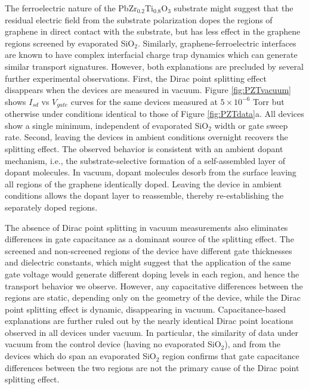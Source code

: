 \documentclass[edeposit,fullpage,draftthesis]{uiucthesis2009}
\begin{document}
The ferroelectric nature of the PbZr$_{0.2}$Ti$_{0.8}$O$_3$ substrate might suggest that the residual electric field from the substrate polarization dopes the regions of graphene in direct contact with the substrate\cite{Baeumer2013,Zheng2010}, but has less effect in the graphene regions screened by evaporated SiO$_2$. Similarly, graphene-ferroelectric interfaces are known to have complex interfacial charge trap dynamics which can generate similar transport signatures\cite{Park2015b}. However, both explanations are precluded by several further experimental observations. First, the Dirac point splitting effect disappears when the devices are measured in vacuum. Figure \ref{fig:PZTvacuum} shows $I_{sd}$ vs $V_{gate}$ curves for the same devices measured at $5\times10^{-6}$ Torr but otherwise under conditions identical to those of Figure \ref{fig:PZTdata}a. All devices show a single minimum, independent of evaporated SiO$_2$ width or gate sweep rate. Second, leaving the devices in ambient conditions overnight recovers the splitting effect. The observed behavior is consistent with an ambient dopant mechanism, i.e., the substrate-selective formation of a self-assembled layer of dopant molecules. In vacuum, dopant molecules desorb from the surface leaving all regions of the graphene identically doped. Leaving the device in ambient conditions allows the dopant layer to reassemble, thereby re-establishing the separately doped regions.

The absence of Dirac point splitting in vacuum measurements also eliminates differences in gate capacitance as a dominant source of the splitting effect. The screened and non-screened regions of the device have different gate thicknesses and dielectric constants, which might suggest that the application of the same gate voltage would generate different doping levels in each region, and hence the transport behavior we observe. However, any capacitative differences between the regions are static, depending only on the geometry of the device, while the Dirac point splitting effect is dynamic, disappearing in vacuum. Capacitance-based explanations are further ruled out by the nearly identical Dirac point locations observed in all devices under vacuum. In particular, the similarity of data under vacuum from the control device (having no evaporated SiO$_2$), and from the devices which do span an evaporated SiO$_2$ region confirms that gate capacitance differences between the two regions are not the primary cause of the Dirac point splitting effect.
\end{document}
